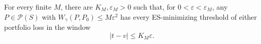 \begin{lemma}\label{lem:threshold-localization} For every finite \(M\), there are \(K_M,\varepsilon_M>0\) such that, for \(0<\varepsilon<\varepsilon_M\), any \(P\in\mathcal P(S)\) with \(W_\gamma(P,P_0)\le M\varepsilon^2\) has every ES-minimizing threshold of either portfolio loss in the window
\begin{equation}
|t-v|\le K_M\varepsilon.
\tag{A.1}\label{eq:A.1}
\end{equation}
\end{lemma}
